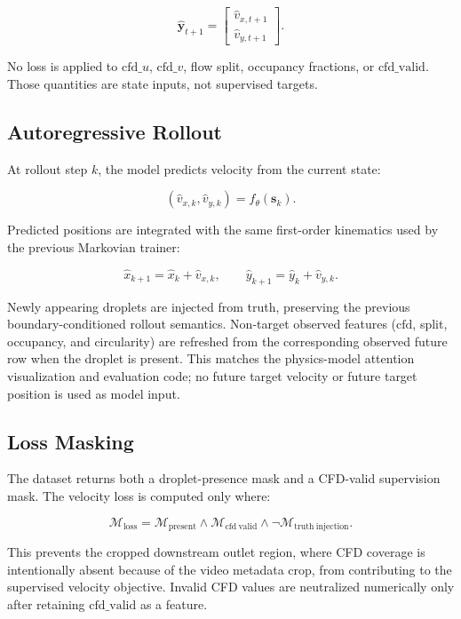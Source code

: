 \[
\hat{\mathbf{y}}_{t+1}
=
\begin{bmatrix}
\hat{v}_{x,t+1} \\
\hat{v}_{y,t+1}
\end{bmatrix}.
\]

No loss is applied to \(\mathrm{cfd}\_u\), \(\mathrm{cfd}\_v\), flow split,
occupancy fractions, or \(\mathrm{cfd}\_\mathrm{valid}\).  Those quantities are
state inputs, not supervised targets.

\subsection{Autoregressive Rollout}

At rollout step \(k\), the model predicts velocity from the current state:

\[
(\hat{v}_{x,k},\hat{v}_{y,k})
=
f_\theta(\mathbf{s}_k).
\]

Predicted positions are integrated with the same first-order kinematics used by
the previous Markovian trainer:

\[
\hat{x}_{k+1} = \hat{x}_k + \hat{v}_{x,k},
\qquad
\hat{y}_{k+1} = \hat{y}_k + \hat{v}_{y,k}.
\]

Newly appearing droplets are injected from truth, preserving the previous
boundary-conditioned rollout semantics.  Non-target observed features
(\(\mathrm{cfd}\), split, occupancy, and circularity) are refreshed from the
corresponding observed future row when the droplet is present.  This matches the
physics-model attention visualization and evaluation code; no future target
velocity or future target position is used as model input.

\subsection{Loss Masking}

The dataset returns both a droplet-presence mask and a CFD-valid supervision
mask.  The velocity loss is computed only where:

\[
\mathcal{M}_{\mathrm{loss}}
=
\mathcal{M}_{\mathrm{present}}
\land
\mathcal{M}_{\mathrm{cfd\ valid}}
\land
\neg \mathcal{M}_{\mathrm{truth\ injection}}.
\]

This prevents the cropped downstream outlet region, where CFD coverage is
intentionally absent because of the video metadata crop, from contributing to
the supervised velocity objective.  Invalid CFD values are neutralized
numerically only after retaining \(\mathrm{cfd}\_\mathrm{valid}\) as a feature.

